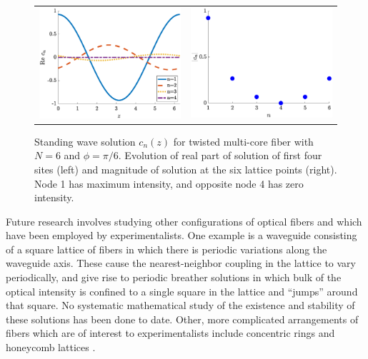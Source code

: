 \documentclass[12pt,reqno,oneside]{article}
\begin{document}
\begin{figure}[H]
\begin{center}
\begin{tabular}{cc}
\includegraphics[width=8cm]{images/evenholestandingwave.eps} &
\includegraphics[width=8cm]{images/evenholeamps.eps}
\end{tabular}
\end{center}
\caption{Standing wave solution $c_n(z)$ for twisted multi-core fiber with $N = 6$ and $\phi = \pi/6$. Evolution of real part of solution of first four sites (left) and magnitude of solution at the six lattice points (right). Node 1 has maximum intensity, and opposite node 4 has zero intensity.}
\label{fig:twistcn}
\end{figure}

Future research involves studying other configurations of optical fibers and which have been employed by experimentalists. One example is a  waveguide consisting of a square lattice of fibers in which there is periodic variations along the waveguide axis. These cause the nearest-neighbor coupling in the lattice to vary periodically, and give rise to periodic breather solutions in which bulk of the optical intensity is confined to a single square in the lattice and ``jumps'' around that square. No systematic mathematical study of the existence and stability of these solutions has been done to date. Other, more complicated arrangements of fibers which are of interest to experimentalists include concentric rings and honeycomb lattices \cite{Lumer2013}.


\footnotesize{  }
\end{document}
